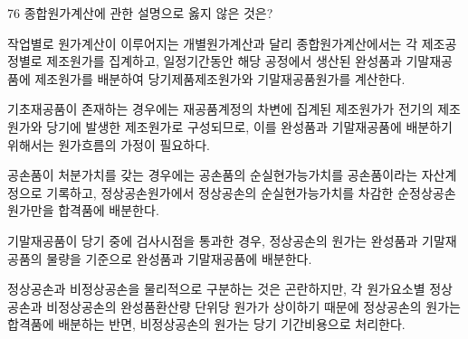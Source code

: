 \begin{question}{76}
종합원가계산에 관한 설명으로 옳지 않은 것은?
\begin{choices}
  \item 작업별로 원가계산이 이루어지는 개별원가계산과 달리 종합원가계산에서는 각 제조공정별로 제조원가를 집계하고, 일정기간동안 해당 공정에서 생산된 완성품과 기말재공품에 제조원가를 배분하여 당기제품제조원가와 기말재공품원가를 계산한다.
  \item 기초재공품이 존재하는 경우에는 재공품계정의 차변에 집계된 제조원가가 전기의 제조원가와 당기에 발생한 제조원가로 구성되므로, 이를 완성품과 기말재공품에 배분하기 위해서는 원가흐름의 가정이 필요하다.
  \item 공손품이 처분가치를 갖는 경우에는 공손품의 순실현가능가치를 공손품이라는 자산계정으로 기록하고, 정상공손원가에서 정상공손의 순실현가능가치를 차감한 순정상공손원가만을 합격품에 배분한다.
  \item 기말재공품이 당기 중에 검사시점을 통과한 경우, 정상공손의 원가는 완성품과 기말재공품의 물량을 기준으로 완성품과 기말재공품에 배분한다.
  \item 정상공손과 비정상공손을 물리적으로 구분하는 것은 곤란하지만, 각 원가요소별 정상공손과 비정상공손의 완성품환산량 단위당 원가가 상이하기 때문에 정상공손의 원가는 합격품에 배분하는 반면, 비정상공손의 원가는 당기 기간비용으로 처리한다.
\end{choices}
\end{question}
